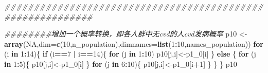 \documentclass[
]{article}
\newenvironment{Shaded}{\begin{snugshade}}{\end{snugshade}}
\newcommand{\CommentTok}[1]{\textcolor[rgb]{0.56,0.35,0.01}{\textit{#1}}}
\newcommand{\ControlFlowTok}[1]{\textcolor[rgb]{0.13,0.29,0.53}{\textbf{#1}}}
\newcommand{\DataTypeTok}[1]{\textcolor[rgb]{0.13,0.29,0.53}{#1}}
\newcommand{\DecValTok}[1]{\textcolor[rgb]{0.00,0.00,0.81}{#1}}
\newcommand{\KeywordTok}[1]{\textcolor[rgb]{0.13,0.29,0.53}{\textbf{#1}}}
\newcommand{\NormalTok}[1]{#1}
\newcommand{\OperatorTok}[1]{\textcolor[rgb]{0.81,0.36,0.00}{\textbf{#1}}}
\newcommand{\OtherTok}[1]{\textcolor[rgb]{0.56,0.35,0.01}{#1}}
\newcommand{\StringTok}[1]{\textcolor[rgb]{0.31,0.60,0.02}{#1}}
\begin{document}
\begin{Shaded}
\begin{Highlighting}[]
\CommentTok{###########################################################}

\CommentTok{########增加一个概率转换，即各人群中无cvd的人cvd发病概率}
\NormalTok{p10 <-}\StringTok{ }\KeywordTok{array}\NormalTok{(}\OtherTok{NA}\NormalTok{,}\DataTypeTok{dim=}\KeywordTok{c}\NormalTok{(}\DecValTok{10}\NormalTok{,n_population),}\DataTypeTok{dimnames=}\KeywordTok{list}\NormalTok{(}\DecValTok{1}\OperatorTok{:}\DecValTok{10}\NormalTok{,names_population))}
\ControlFlowTok{for}\NormalTok{ (i }\ControlFlowTok{in} \DecValTok{1}\OperatorTok{:}\DecValTok{14}\NormalTok{)\{}
  \ControlFlowTok{if}\NormalTok{ (i}\OperatorTok{==}\DecValTok{7} \OperatorTok{|}\StringTok{ }\NormalTok{i}\OperatorTok{==}\DecValTok{14}\NormalTok{)\{}
    \ControlFlowTok{for}\NormalTok{ (j }\ControlFlowTok{in} \DecValTok{1}\OperatorTok{:}\DecValTok{10}\NormalTok{)}
\NormalTok{      p10[j,i]<-p1_}\DecValTok{0}\NormalTok{[i]}
\NormalTok{  \}}
  \ControlFlowTok{else}\NormalTok{ \{}
    \ControlFlowTok{for}\NormalTok{ (j }\ControlFlowTok{in} \DecValTok{1}\OperatorTok{:}\DecValTok{5}\NormalTok{)\{}
\NormalTok{      p10[j,i]<-p1_}\DecValTok{0}\NormalTok{[i]}
\NormalTok{    \}}
    \ControlFlowTok{for}\NormalTok{ (j }\ControlFlowTok{in} \DecValTok{6}\OperatorTok{:}\DecValTok{10}\NormalTok{)\{}
\NormalTok{      p10[j,i]<-p1_}\DecValTok{0}\NormalTok{[i}\OperatorTok{+}\DecValTok{1}\NormalTok{]}
\NormalTok{    \}}
\NormalTok{  \}}
\NormalTok{\}}
\NormalTok{p10}
\end{Highlighting}
\end{Shaded}
\end{document}
